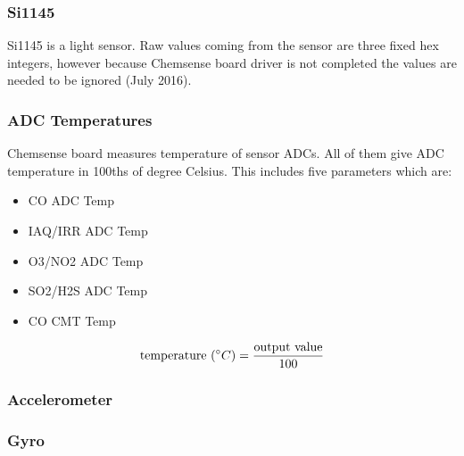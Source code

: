 % 
% 

\subsubsection{ Si1145}

Si1145 is a light sensor. Raw values coming from the sensor are three fixed hex integers, however because Chemsense board driver is not completed the values are needed to be ignored (July 2016).

\subsubsection{ ADC Temperatures}
Chemsense board measures temperature of sensor ADCs. All of them give ADC temperature in 100ths of degree Celsius. This includes five parameters which are:
 
\begin{itemize}
  \item CO ADC Temp
  \item IAQ/IRR ADC Temp
  \item O3/NO2 ADC Temp
  \item SO2/H2S ADC Temp
  \item CO CMT Temp
\end{itemize}


{\centering 
 \[ \text{temperature }(\degree C) = \frac{\text{output value}}{100} \]
}

\subsubsection{ Accelerometer}

\subsubsection{ Gyro}
